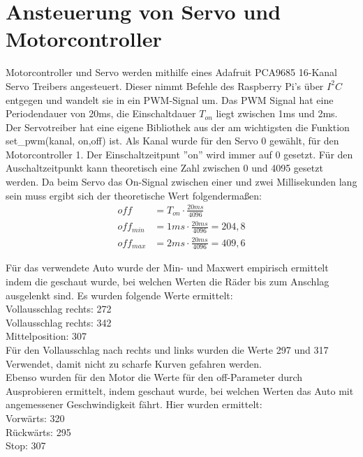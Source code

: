 \section{Ansteuerung von Servo und Motorcontroller}


Motorcontroller und Servo werden mithilfe eines Adafruit PCA9685 16-Kanal Servo Treibers angesteuert. Dieser nimmt Befehle des Raspberry Pi's über $I^2C$ entgegen und wandelt sie in ein PWM-Signal um. Das PWM Signal hat eine Periodendauer von 20ms, die Einschaltdauer $T_{on}$ liegt zwischen 1ms und 2ms. \\
Der Servotreiber hat eine eigene Bibliothek aus der am wichtigsten die Funktion set\_pwm(kanal, on,off) ist. Als Kanal wurde für den Servo 0 gewählt, für den Motorcontroller 1. Der Einschaltzeitpunt ''on'' wird immer auf 0 gesetzt. Für den Auschaltzeitpunkt kann theoretisch eine Zahl zwischen 0 und 4095 gesetzt werden. Da beim Servo das On-Signal zwischen einer und zwei Millisekunden lang sein muss ergibt sich der theoretische Wert folgendermaßen: \\

\begin{align*}
	off&=T_{on}\cdot\frac{20ms}{4096}\\
	off_{min}&=1ms\cdot\frac{20ms}{4096} =204,8\\
	off_{max}&=2ms\cdot\frac{20ms}{4096} = 409,6
\end{align*}

Für das verwendete Auto wurde der Min- und Maxwert empirisch ermittelt indem die geschaut wurde, bei welchen Werten die Räder bis zum Anschlag ausgelenkt sind. Es wurden folgende Werte ermittelt:\\
Vollausschlag rechts: 272\\
Vollausschlag rechts: 342\\
Mittelposition: 307\\

Für den Vollausschlag nach rechts und links wurden die Werte 297 und 317 Verwendet, damit nicht zu scharfe Kurven gefahren werden.\\

Ebenso wurden für den Motor die Werte für den off-Parameter durch Ausprobieren ermittelt, indem geschaut wurde, bei welchen Werten das Auto mit angemessener Geschwindigkeit fährt. Hier wurden ermittelt:\\
Vorwärts: 320\\
Rückwärts: 295\\
Stop: 307\\


